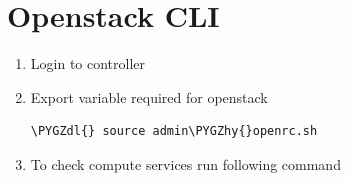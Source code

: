 \documentclass[letterpaper,10pt,english]{sphinxmanual}
\def\PYGZdl{\char`\$}
\def\PYGZhy{\char`\-}
\begin{document}
\section{Openstack CLI}
\label{_source/admin_guide/cli_commands:openstack-cli}\label{_source/admin_guide/cli_commands::doc}\begin{enumerate}
\item {} 
Login to controller

\item {} 
Export variable required for openstack

\begin{Verbatim}[commandchars=\\\{\}]
\PYGZdl{} source admin\PYGZhy{}openrc.sh
\end{Verbatim}

\item {} 
To check compute services run following command


\end{enumerate}
\end{document}
